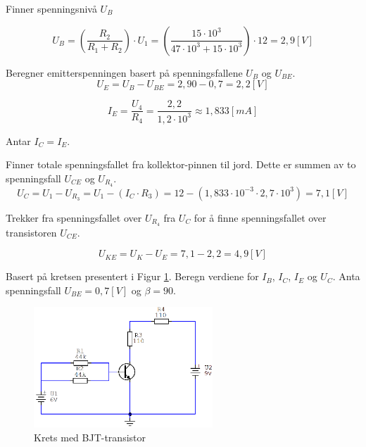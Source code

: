 \begin{solution}[name=Løsningsforslag oppgave]
Finner spenningsnivå $U_B$

\[U_B= \left(\frac{R_2}{R_1+R_2} \right) \cdot U_1 = \left(\frac{15 \cdot 10^3}{47 \cdot 10^3 + 15 \cdot 10^3} \right) \cdot 12 = 2,9 [V]\]

Beregner emitterspenningen basert på spenningsfallene  $U_B$ og $U_{BE}$.
\[U_E = U_B - U_{BE}=2,90-0,7=2,2 [V]\]

\[I_E = \frac{U_4}{R_4}=\frac{2,2}{1,2 \cdot 10^3} \approx 1,833 [mA]\]

Antar $I_C = I_E$.

Finner totale spenningsfallet fra kollektor-pinnen til jord. Dette er summen av to spenningsfall $U_{CE}$ og $U_{R_{4}}$.
\[U_C = U_1-U_{R_{3}}=U_1-(I_C \cdot R_3)=12-(1,833 \cdot 10^{-3} \cdot 2,7 \cdot 10^{3})=7,1 [V]\]

Trekker fra spenningsfallet over $U_{R_{4}}$ fra $U_C$ for å finne spenningsfallet over transistoren $U_{CE}$.

\[U_{KE} = U_K-U_E=7,1-2,2=4,9 [V]\]

\end{solution}

\vspace{0.5cm} %


\begin{question}[name=Oppgave, topic=transBJT]
	Basert på kretsen presentert i Figur \ref{fig:tranBJT4}. Beregn verdiene for $I_B$, $I_C$, $I_E$ og $U_C$. Anta spenningsfall $U_{BE}=0,7[V]$ og $\beta=90$.

	\begin{figure}[H]
		\centering
		\includegraphics[width=0.6\textwidth]{transistor-BJT/figurer/krets4.png}
		\caption{Krets med BJT-transistor}
		\label{fig:tranBJT4}
	\end{figure}

\end{question}

